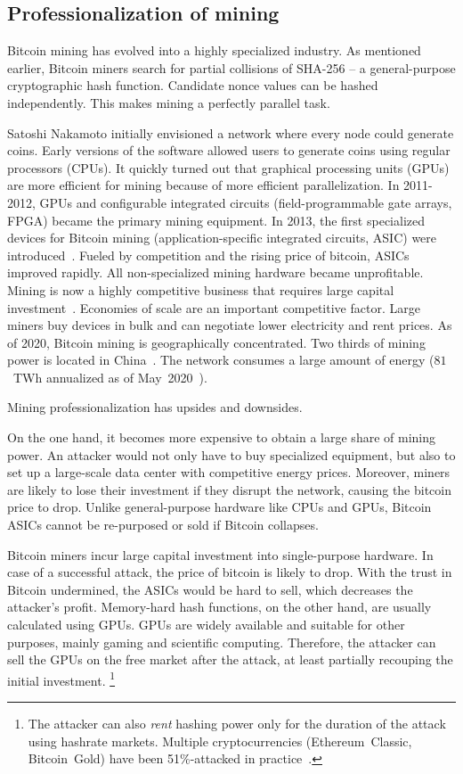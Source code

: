 \subsection{Professionalization of mining}

Bitcoin mining has evolved into a highly specialized industry.
As mentioned earlier, Bitcoin miners search for partial collisions of SHA-256 -- a general-purpose cryptographic hash function.
Candidate nonce values can be hashed independently.
This makes mining a perfectly parallel task.

Satoshi Nakamoto initially envisioned a network where every node could generate coins.
Early versions of the software allowed users to generate coins using regular processors (CPUs).
It quickly turned out that graphical processing units (GPUs) are more efficient for mining because of more efficient parallelization.
In 2011-2012, GPUs and configurable integrated circuits (field-programmable gate arrays, FPGA) became the primary mining equipment.
In 2013, the first specialized devices for Bitcoin mining (application-specific integrated circuits, ASIC) were introduced~\cite{Kim2020}.
Fueled by competition and the rising price of bitcoin, ASICs improved rapidly.
All non-specialized mining hardware became unprofitable.
Mining is now a highly competitive business that requires large capital investment~\cite{Kroll2013}.
Economies of scale are an important competitive factor.
Large miners buy devices in bulk and can negotiate lower electricity and rent prices.
As of 2020, Bitcoin mining is geographically concentrated.
Two thirds of mining power is located in China~\cite{Rauchs2020}.
The network consumes a large amount of energy ($81$~TWh annualized as of May~2020~\cite{Rauchs2020}).

Mining professionalization has upsides and downsides.

On the one hand, it becomes more expensive to obtain a large share of mining power.
An attacker would not only have to buy specialized equipment, but also to set up a large-scale data center with competitive energy prices.
Moreover, miners are likely to lose their investment if they disrupt the network, causing the bitcoin price to drop.
Unlike general-purpose hardware like CPUs and GPUs, Bitcoin ASICs cannot be re-purposed or sold if Bitcoin collapses.

Bitcoin miners incur large capital investment into single-purpose hardware.
In case of a successful attack, the price of bitcoin is likely to drop.
With the trust in Bitcoin undermined, the ASICs would be hard to sell, which decreases the attacker's profit.
Memory-hard hash functions, on the other hand, are usually calculated using GPUs.
GPUs are widely available and suitable for other purposes, mainly gaming and scientific computing.
Therefore, the attacker can sell the GPUs on the free market after the attack, at least partially recouping the initial investment.
 \footnote{The attacker can also \textit{rent} hashing power only for the duration of the attack using hashrate markets. Multiple cryptocurrencies (Ethereum~Classic, Bitcoin~Gold) have been 51\%-attacked in practice~\cite{Xazax3102019}.}

